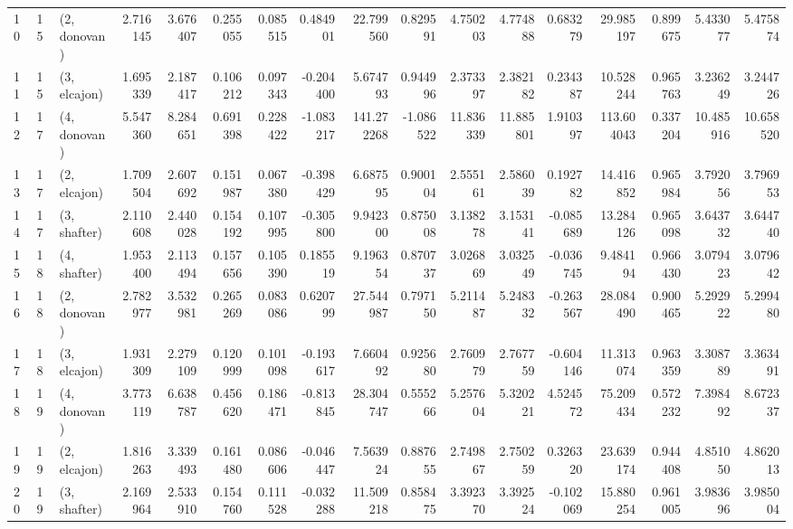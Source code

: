 \begin{tabular}{lllrrrrrrrrrrrrrr}
10 &    15 &  (2, donovan) &  2.716145 &  3.676407 &   0.255055 &  0.085515 &  0.484901 &   22.799560 &  0.829591 &   4.750203 &   4.774888 &  0.683279 &   29.985197 &  0.899675 &   5.433077 &   5.475874 \\
11 &    15 &  (3, elcajon) &  1.695339 &  2.187417 &   0.106212 &  0.097343 & -0.204400 &    5.674793 &  0.944996 &   2.373397 &   2.382182 &  0.234387 &   10.528244 &  0.965763 &   3.236249 &   3.244726 \\
12 &    17 &  (4, donovan) &  5.547360 &  8.284651 &   0.691398 &  0.228422 & -1.083217 &  141.272268 & -1.086522 &  11.836339 &  11.885801 &  1.910397 &  113.604043 &  0.337204 &  10.485916 &  10.658520 \\
13 &    17 &  (2, elcajon) &  1.709504 &  2.607692 &   0.151987 &  0.067380 & -0.398429 &    6.687595 &  0.900104 &   2.555161 &   2.586039 &  0.192782 &   14.416852 &  0.965984 &   3.792056 &   3.796953 \\
14 &    17 &  (3, shafter) &  2.110608 &  2.440028 &   0.154192 &  0.107995 & -0.305800 &    9.942300 &  0.875008 &   3.138278 &   3.153141 & -0.085689 &   13.284126 &  0.965098 &   3.643732 &   3.644740 \\
15 &    18 &  (4, shafter) &  1.953400 &  2.113494 &   0.157656 &  0.105390 &  0.185519 &    9.196354 &  0.870737 &   3.026869 &   3.032549 & -0.036745 &    9.484194 &  0.966430 &   3.079423 &   3.079642 \\
16 &    18 &  (2, donovan) &  2.782977 &  3.532981 &   0.265269 &  0.083086 &  0.620799 &   27.544987 &  0.797150 &   5.211487 &   5.248332 & -0.263567 &   28.084490 &  0.900465 &   5.292922 &   5.299480 \\
17 &    18 &  (3, elcajon) &  1.931309 &  2.279109 &   0.120999 &  0.101098 & -0.193617 &    7.660492 &  0.925680 &   2.760979 &   2.767759 & -0.604146 &   11.313074 &  0.963359 &   3.308789 &   3.363491 \\
18 &    19 &  (4, donovan) &  3.773119 &  6.638787 &   0.456620 &  0.186471 & -0.813845 &   28.304747 &  0.555266 &   5.257604 &   5.320221 &  4.524572 &   75.209434 &  0.572232 &   7.398492 &   8.672337 \\
19 &    19 &  (2, elcajon) &  1.816263 &  3.339493 &   0.161480 &  0.086606 & -0.046447 &    7.563924 &  0.887655 &   2.749867 &   2.750259 &  0.326320 &   23.639174 &  0.944408 &   4.851050 &   4.862013 \\
20 &    19 &  (3, shafter) &  2.169964 &  2.533910 &   0.154760 &  0.111528 & -0.032288 &   11.509218 &  0.858475 &   3.392370 &   3.392524 & -0.102069 &   15.880254 &  0.961005 &   3.983696 &   3.985004 \\

\end{tabular}
